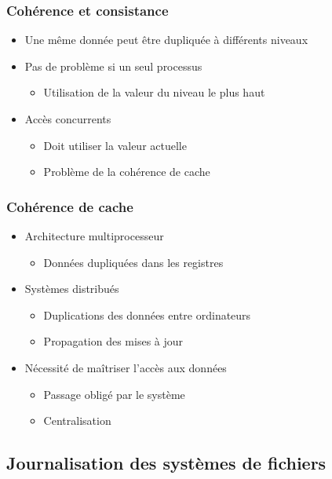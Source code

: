 \begin{frame}
\frametitle{Cohérence et consistance}
\begin{itemize}
\item Une même donnée peut être dupliquée à différents niveaux
\item Pas de problème si un seul processus
\begin{itemize}
\item Utilisation de la valeur du niveau le plus haut
\end{itemize}
\item Accès concurrents
\begin{itemize}
\item Doit utiliser la valeur actuelle
\item Problème de la cohérence de cache
\end{itemize}
\end{itemize}
\end{frame}


\begin{frame}
\frametitle{Cohérence de cache}
\begin{itemize}
\item Architecture multiprocesseur
\begin{itemize}
\item Données dupliquées dans les registres
\end{itemize}
\item Systèmes distribués
\begin{itemize}
\item Duplications des données entre ordinateurs
\item Propagation des mises à jour
\end{itemize}
\item Nécessité de maîtriser l’accès aux données
\begin{itemize}
\item Passage obligé par le système
\item Centralisation
\end{itemize}
\end{itemize}
\end{frame}

\subsection{Journalisation des systèmes de fichiers}

